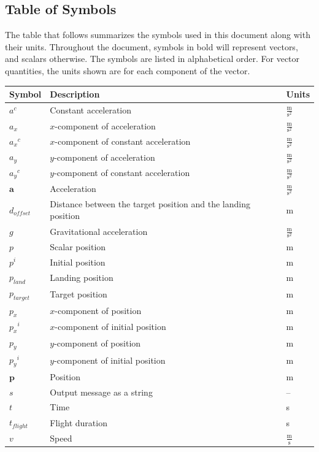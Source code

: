 \documentclass[12pt]{article}
\begin{document}
\subsection{Table of Symbols}
\label{Sec:ToS}
The table that follows summarizes the symbols used in this document along with their units. Throughout the document, symbols in bold will represent vectors, and scalars otherwise. The symbols are listed in alphabetical order. For vector quantities, the units shown are for each component of the vector.
\begin{longtabu}{l X[l] l}
\toprule
Symbol & Description & Units
\\
\midrule
\endhead
${a^{c}}$ & Constant acceleration & $\frac{\text{m}}{\text{s}^{2}}$
\\
${a_{x}}$ & $x$-component of acceleration & $\frac{\text{m}}{\text{s}^{2}}$
\\
${{a_{x}}^{c}}$ & $x$-component of constant acceleration & $\frac{\text{m}}{\text{s}^{2}}$
\\
${a_{y}}$ & $y$-component of acceleration & $\frac{\text{m}}{\text{s}^{2}}$
\\
${{a_{y}}^{c}}$ & $y$-component of constant acceleration & $\frac{\text{m}}{\text{s}^{2}}$
\\
$\mathbf{a}$ & Acceleration & $\frac{\text{m}}{\text{s}^{2}}$
\\
${d_{offset}}$ & Distance between the target position and the landing position & m
\\
$g$ & Gravitational acceleration & $\frac{\text{m}}{\text{s}^{2}}$
\\
$p$ & Scalar position & m
\\
${p^{i}}$ & Initial position & m
\\
${p_{land}}$ & Landing position & m
\\
${p_{target}}$ & Target position & m
\\
${p_{x}}$ & $x$-component of position & m
\\
${{p_{x}}^{i}}$ & $x$-component of initial position & m
\\
${p_{y}}$ & $y$-component of position & m
\\
${{p_{y}}^{i}}$ & $y$-component of initial position & m
\\
$\mathbf{p}$ & Position & m
\\
$s$ & Output message as a string & --
\\
$t$ & Time & s
\\
${t_{flight}}$ & Flight duration & s
\\
$v$ & Speed & $\frac{\text{m}}{\text{s}}$

\end{longtabu}
\end{document}
